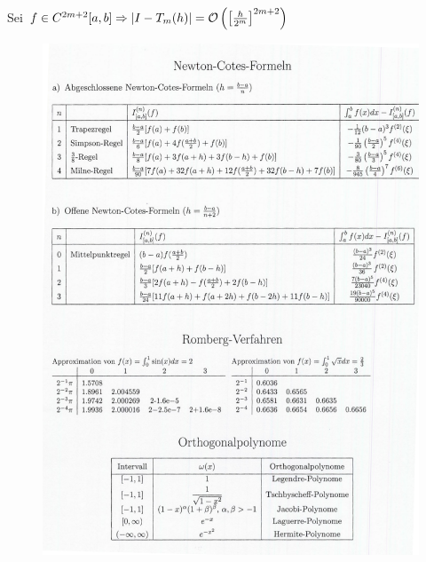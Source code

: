  Sei $f \in C^{2m+2}[a,b] \Rightarrow \left| I-T_m(h) \right| = \mathcal{O}\left(\left[\frac{h}{2^m} \right]^{2m+2} \right)$
\begin{figure}[htbp]
  \centering
  \includegraphics[width=\textwidth]{figures/num_int.png}
\end{figure}


